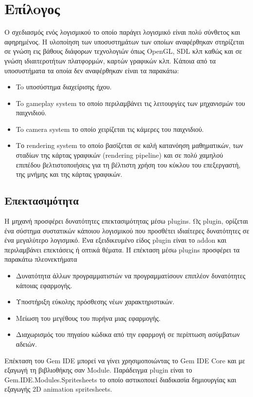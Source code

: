 \chapter{Επίλoγος}
Ο σχεδιασμός ενός λογισμικού το οποίο παράγει λογισμικό είναι πολύ σύνθετος και αφηρημένος. Η υλοποίηση των υποσυστημάτων των οποίων αναφέρθηκαν στηρίζεται σε γνώση εις βάθους διάφορων τεχνολογιών όπως \gls{OpenGL}, SDL κλπ καθώς και σε γνώση ιδιαιτεροτήτων πλατφορμών, καρτών γραφικών κλπ. Κάποια από τα υποσυστήματα τα οποία δεν αναφέρθηκαν είναι τα παρακάτω:
\begin{itemize}
	\item To υποσύστημα διαχείρισης ήχου.
	\item To gameplay system το οποίο περιλαμβάνει τις λειτουργίες των μηχανισμών του παιχνιδιού.
	\item To camera system το οποίο χειρίζεται τις κάμερες του παιχνιδιού. 
	\item Το rendering system το οποίο βασίζεται σε καλή κατανόηση μαθηματικών, των σταδίων της κάρτας γραφικών (rendering pipeline) και σε πολύ χαμηλού επιπέδου βελτιστοποιήσεις για τη βέλτιστη χρήση του κύκλου του επεξεργαστή, της μνήμης και της κάρτας γραφικών.	
\end{itemize}

\section{Επεκτασιμότητα}	
	Η μηχανή προσφέρει δυνατότητες επεκτασιμότητας μέσω plugins.
	Ως plugin, ορίζεται ένα σύστημα συστατικών κάποιου λογισμικού που προσθέτει ιδιαίτερες δυνατότητες σε ένα μεγαλύτερο λογισμικό. Ένα εξειδικευμένο είδος plugin είναι το addon και περιλαμβάνει επεκτάσεις ή οπτικά θέματα. Η επέκταση μέσω plugins προσφέρει τα παρακάτω πλεονεκτήματα
	\begin{itemize}
		\item Δυνατότητα άλλων προγραμματιστών να προγραμματίσουν επιπλέον δυνατότητες κάποιας εφαρμογής.
		\item Υποστήριξη εύκολης πρόσθεσης νέων χαρακτηριστικών.
		\item Μείωση του μεγέθους του πυρήνα μιας εφαρμογής.
		\item Διαχωρισμός του πηγαίου κώδικα από την εφαρμογή σε περίπτωση ασύμβατων αδειών.
	\end{itemize}
	Επέκταση του Gem IDE μπορεί να γίνει χρησιμοποιώντας το Gem IDE Core και με εξαγωγή τη βιβλιοθήκης σαν Module. Παράδειγμα plugin είναι το Gem.IDE.Modules.Spritesheets το οποίο αστικοποιεί διαδικασία δημιουργίας και εξαγωγής 2D animation spritesheets.	
	
